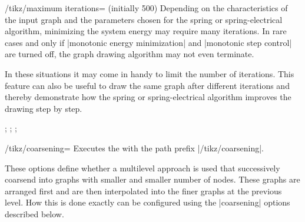 \begin{key}{/tikz/maximum iterations= (initially 500)}
  Depending on the characteristics of the input graph and the parameters
  chosen for the spring or spring-electrical algorithm, minimizing the
  system energy may require many iterations. In rare cases and only if
  |monotonic energy minimization| and |monotonic step control| are
  turned off, the graph drawing algorithm may not even terminate.

  In these situations it may come in handy to limit the number of
  iterations. This feature can also be useful to draw the same graph
  after different iterations and thereby demonstrate how the spring or
  spring-electrical algorithm improves the drawing step by step.
  \begin{codeexample}[]
\tikz {};
\tikz {};
\tikz {};
  \end{codeexample}
\end{key}


\begin{key}{/tikz/coarsening=}
  Executes the  with the path prefix |/tikz/coarsening|.
  
  These options define whether a multilevel approach is used that
  successively coarsend into graphs with smaller and smaller number
  of nodes. These graphs are arranged first and are then interpolated
  into the finer graphs at the previous level. How this is done exactly
  can be configured using the |coarsening| options described below.
\end{key}

